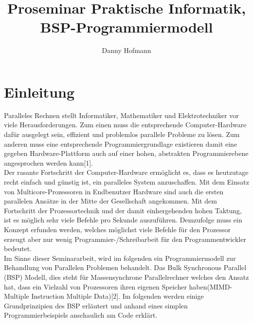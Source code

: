\documentclass[a4paper,10pt]{scrartcl}
\title{Proseminar Praktische Informatik, BSP-Programmiermodell}
\author{Danny Hofmann}
\begin{document}
\tableofcontents
\newpage

\section{Einleitung}

Paralleles Rechnen stellt Informatiker, Mathematiker und Elektrotechniker vor viele Herausforderungen. Zum einen muss die entsprechende Computer-Hardware dafür ausgelegt sein, effizient und problemlos parallele Probleme zu lösen. Zum anderen muss eine entsprechende Programmiergrundlage existieren damit eine gegeben Hardware-Plattform auch auf einer hohen, abstrakten Programmierebene angesprochen werden kann[1].\\
Der rasante Fortschritt der Computer-Hardware ermöglicht es, dass es heutzutage recht einfach und günstig ist, ein paralleles System anzuschaffen. Mit dem Einsatz von Multicore-Prozessoren in Endbenutzer Hardware sind auch die ersten parallelen Ansätze in der Mitte der Gesellschaft angekommen. Mit dem Fortschritt der Prozessortechnik und der damit einhergehenden hohen Taktung, ist es möglich sehr viele Befehle pro Sekunde auszuführen. Demzufolge muss ein Konzept erfunden werden, welches möglichst viele Befehle für den Prozessor erzeugt aber nur wenig Programmier-/Schreibarbeit für den Programmentwickler bedeutet.\\
Im Sinne dieser Seminararbeit, wird im folgenden ein Programmiermodell zur Behandlung von Parallelen Problemen behandelt. Das Bulk Synchronous Parallel (BSP) Modell, dies steht für Massensynchrone Parallelrechner welches den Ansatz hat, dass ein Vielzahl von Prozessoren ihren eigenen Speicher haben(MIMD-Multiple Instruction Multiple Data)[2]. Im folgenden werden einige Grundprinzipien des BSP erläutert und anhand eines simplen Programmierbeispiels anschaulich am Code erklärt.  
\end{document}
